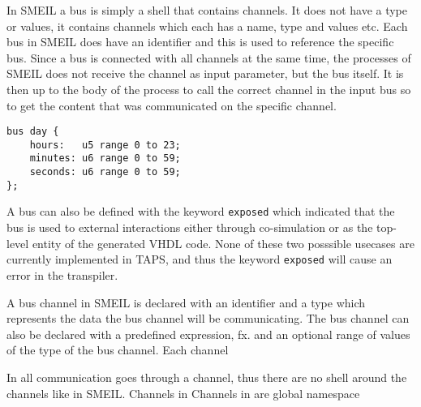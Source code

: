 In SMEIL a bus is simply a shell that contains channels. It does not have a type or values, it contains channels which each has a name, type and values etc. Each bus in SMEIL does have an identifier and this is used to reference the specific bus.
Since a bus is connected with all channels at the same time, the processes of SMEIL does not receive the channel as input parameter, but the bus itself. It is then up to the body of the process to call the correct channel in the input bus so to get the content that was communicated on the specific channel.

\begin{verbatim}
bus day {
    hours:   u5 range 0 to 23;
    minutes: u6 range 0 to 59;
    seconds: u6 range 0 to 59;
};
\end{verbatim}

A bus can also be defined with the keyword \texttt{exposed} which indicated that the bus is used to external interactions either through co-simulation or as the top-level entity of the generated VHDL code. None of these two posssible usecases are currently implemented in TAPS, and thus the keyword \texttt{exposed} will cause an error in the transpiler. %





A bus channel in SMEIL is declared with an identifier and a type which represents the data the bus channel will be communicating. The bus channel can also be declared with a predefined expression, fx. %
and an optional range of values of the type of the bus channel.
Each channel

In \cspm all communication goes through a channel, thus there are no shell around the channels like in SMEIL.
Channels in \cspm %
Channels in \cspm are global namespace %




